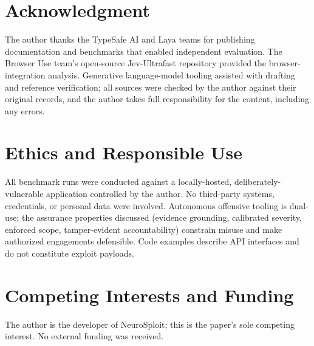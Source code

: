 \documentclass[conference]{IEEEtran}
\begin{document}
\section*{Acknowledgment}
The author thanks the TypeSafe AI and Laya teams for publishing documentation and benchmarks that enabled independent evaluation. The Browser Use team's open-source Jev-Ultrafast repository provided the browser-integration analysis. Generative language-model tooling assisted with drafting and reference verification; all sources were checked by the author against their original records, and the author takes full responsibility for the content, including any errors.

\section*{Ethics and Responsible Use}
All benchmark runs were conducted against a locally-hosted, deliberately-vulnerable application controlled by the author. No third-party systems, credentials, or personal data were involved. Autonomous offensive tooling is dual-use; the assurance properties discussed (evidence grounding, calibrated severity, enforced scope, tamper-evident accountability) constrain misuse and make authorized engagements defensible. Code examples describe API interfaces and do not constitute exploit payloads.

\section*{Competing Interests and Funding}
The author is the developer of NeuroSploit; this is the paper's sole competing interest. No external funding was received.
\end{document}
